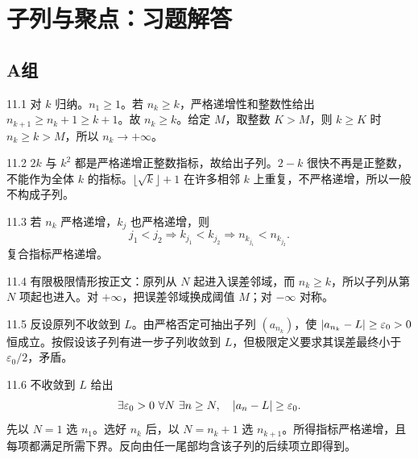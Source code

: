 \chapter{子列与聚点：习题解答}

\section*{A组}

\begin{solution}{11.1}
对 \(k\) 归纳。\(n_1\ge1\)。若 \(n_k\ge k\)，严格递增性和整数性给出
\(n_{k+1}\ge n_k+1\ge k+1\)。故 \(n_k\ge k\)。给定 \(M\)，取整数 \(K>M\)，则 \(k\ge K\) 时 \(n_k\ge k>M\)，所以 \(n_k\to+\infty\)。
\end{solution}

\begin{solution}{11.2}
\(2k\) 与 \(k^2\) 都是严格递增正整数指标，故给出子列。\(2-k\) 很快不再是正整数，不能作为全体 \(k\) 的指标。\(\lfloor\sqrt k\rfloor+1\) 在许多相邻 \(k\) 上重复，不严格递增，所以一般不构成子列。
\end{solution}

\begin{solution}{11.3}
若 \(n_k\) 严格递增，\(k_j\) 也严格递增，则
\[
 j_1<j_2\Longrightarrow k_{j_1}<k_{j_2}
 \Longrightarrow n_{k_{j_1}}<n_{k_{j_2}}.
\]
复合指标严格递增。
\end{solution}

\begin{solution}{11.4}
有限极限情形按正文：原列从 \(N\) 起进入误差邻域，而 \(n_k\ge k\)，所以子列从第 \(N\) 项起也进入。对 \(+\infty\)，把误差邻域换成阈值 \(M\)；对 \(-\infty\) 对称。
\end{solution}

\begin{solution}{11.5}
反设原列不收敛到 \(L\)。由严格否定可抽出子列 \((a_{n_k})\)，使
\(\left|a_{n_k}-L\right|\ge\varepsilon_0>0\) 恒成立。按假设该子列有进一步子列收敛到 \(L\)，但极限定义要求其误差最终小于 \(\varepsilon_0/2\)，矛盾。
\end{solution}

\begin{solution}{11.6}
不收敛到 \(L\) 给出
\[
 \exists\varepsilon_0>0\ \forall N\ \exists n\ge N,\quad
 \abs{a_n-L}\ge\varepsilon_0.
\]
先以 \(N=1\) 选 \(n_1\)。选好 \(n_k\) 后，以 \(N=n_k+1\) 选 \(n_{k+1}\)。所得指标严格递增，且每项都满足所需下界。反向由任一尾部均含该子列的后续项立即得到。
\end{solution}

